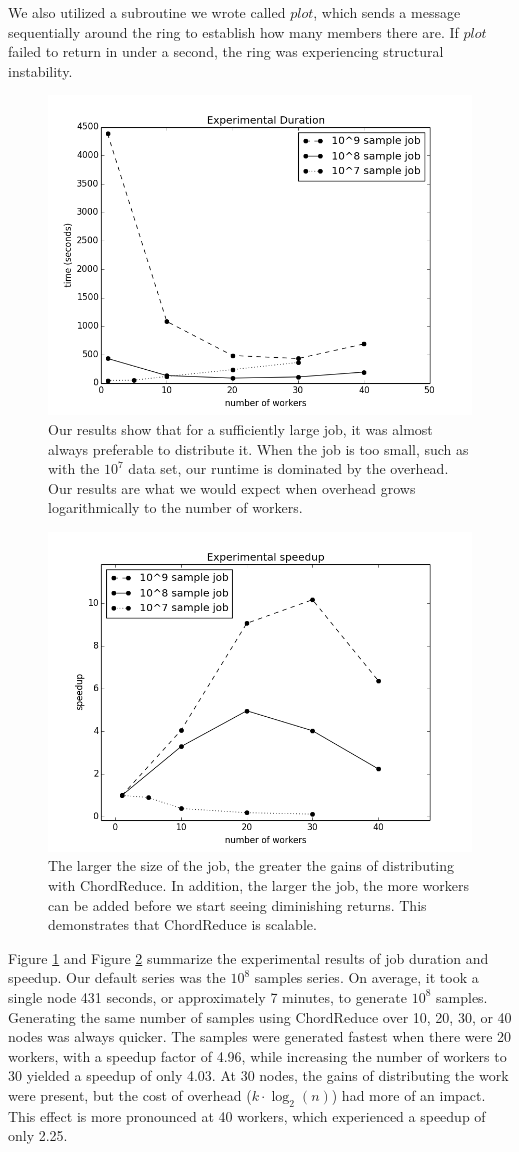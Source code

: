 We also utilized a subroutine we wrote called $plot$, which sends a message sequentially around the ring to establish how many members there are.  
If $plot$ failed to return in under a second, the ring was experiencing structural instability.

\begin{figure}
	\centering
	\includegraphics[width=0.5\linewidth]{figs/expTime}
	\caption{Our results show that for a sufficiently large job, it was almost always preferable to distribute it.  
		When the job is too small, such as with the $10^{7}$ data set, our runtime is dominated by the overhead.  
		Our results are what we would expect when overhead grows logarithmically to the number of workers.}
	\label{fig:expTime}
\end{figure}


\begin{figure}
	\centering
	\includegraphics[width=0.5\linewidth]{figs/expSpeed}
	\caption{The larger the size of the job, the greater the gains of distributing with ChordReduce.  In addition, the larger the job, the more workers can be added before we start seeing diminishing returns.  This demonstrates that ChordReduce is scalable.}
	\label{fig:expSpeed}
\end{figure}

Figure \ref{fig:expTime} and Figure \ref{fig:expSpeed} summarize the experimental results of job duration and speedup.  
Our default series was the $10^{8}$ samples series.  
On average, it took a single node 431 seconds, or approximately 7 minutes, to generate $10^{8}$ samples.  
Generating the same number of samples using ChordReduce over 10, 20, 30, or 40 nodes was always quicker.  
The samples were generated fastest when there were 20 workers, with a speedup factor of 4.96, while increasing the number of workers to 30 yielded a speedup of only 4.03.  
At 30 nodes, the gains of distributing the work were present, but the cost of overhead ($k \cdot \log_{2}(n)$) had more of an impact.  
This effect is more pronounced at 40 workers, which experienced  a speedup of only 2.25.

